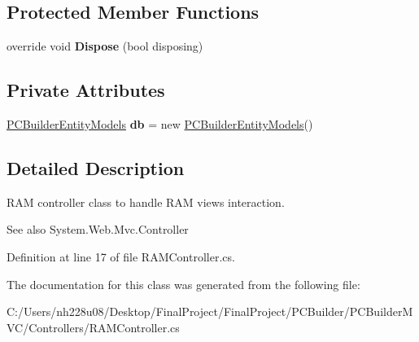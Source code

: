\subsection*{Protected Member Functions}
\begin{DoxyCompactItemize}
\item 
override void {\bfseries Dispose} (bool disposing)\hypertarget{class_p_c_builder_m_v_c_1_1_controllers_1_1_r_a_m_controller_a8c08e16079a01fff70e528def1005323}{}\label{class_p_c_builder_m_v_c_1_1_controllers_1_1_r_a_m_controller_a8c08e16079a01fff70e528def1005323}

\end{DoxyCompactItemize}
\subsection*{Private Attributes}
\begin{DoxyCompactItemize}
\item 
\hyperlink{class_p_c_builder_m_v_c_1_1_models_1_1_p_c_builder_entity_models}{P\+C\+Builder\+Entity\+Models} {\bfseries db} = new \hyperlink{class_p_c_builder_m_v_c_1_1_models_1_1_p_c_builder_entity_models}{P\+C\+Builder\+Entity\+Models}()\hypertarget{class_p_c_builder_m_v_c_1_1_controllers_1_1_r_a_m_controller_a6134de9d72d65071465e49a3f52e7f83}{}\label{class_p_c_builder_m_v_c_1_1_controllers_1_1_r_a_m_controller_a6134de9d72d65071465e49a3f52e7f83}

\end{DoxyCompactItemize}


\subsection{Detailed Description}
R\+AM controller class to handle R\+AM views interaction. 

\begin{DoxySeeAlso}{See also}
System.\+Web.\+Mvc.\+Controller


\end{DoxySeeAlso}


Definition at line 17 of file R\+A\+M\+Controller.\+cs.



The documentation for this class was generated from the following file\+:\begin{DoxyCompactItemize}
\item 
C\+:/\+Users/nh228u08/\+Desktop/\+Final\+Project/\+Final\+Project/\+P\+C\+Builder/\+P\+C\+Builder\+M\+V\+C/\+Controllers/R\+A\+M\+Controller.\+cs\end{DoxyCompactItemize}
